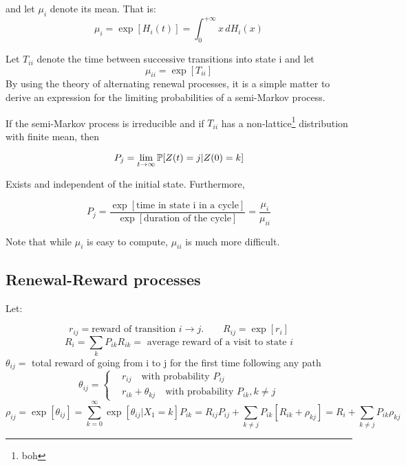 and let $\mu_i$ denote its mean. That is:
\begin{equation}
\mu_i = \exp[H_i(t)] = \int_{0}^{+\infty}x \,dH_i(x)
\end{equation}

Let $T_{ii}$ denote the time between successive transitions into state i and let
\begin{equation}
\mu_{ii}=\exp [T_{ii}]
\end{equation}
By using the theory of alternating renewal processes, it is a
simple matter to derive an expression for the limiting probabilities of a semi-Markov
process.

\begin{theorem}
	If the semi-Markov process is irreducible and if $T_{ii}$ has a non-lattice\footnote{boh} distribution with finite mean, then

	$$P_j = \lim_{t \to \infty} \mathbb{P}[Z(t)=j | Z(0)=k]$$

	Exists and independent of the initial state. Furthermore,

	$$P_j = \frac{\exp[\mbox{time in state i in a cycle}]}{\exp[\mbox{duration of the cycle}]} = \frac{\mu_i}{\mu_{ii}}$$

\end{theorem}
Note that while $\mu_i$ is easy to compute, $\mu_{ii}$ is much more difficult.

\subsection{Renewal-Reward processes}

Let:

\begin{equation}
r_{ij} = \mbox{reward of transition } i\rightarrow j. \qquad R_{ij} = \exp[r_i]
\end{equation}
\begin{equation}
R_i = \sum_k P_{ik} R_{ik} = \mbox{ average reward of a visit to state } i
\end{equation}
$\theta_{ij} = $ total reward of going from i to j for the first time following any path
\begin{equation}
\theta_{ij} = \begin{cases}
&r_{ij} \quad\mbox{with probability } P_{ij}\\
&r_{ik}+\theta_{kj}  \quad\mbox{with probability } P_{ik}, k\neq j
\end{cases}
\end{equation}
\begin{equation*}
\rho_{ij} = \exp[\theta_{ij}] = \sum_{k=0}^{\infty}\exp[\theta_{ij}| X_1=k] P_{ik} = R_{ij}P_{ij} +\sum_{k \neq j} P_{ik} [R_{ik}+\rho_{kj}] = R_i + \sum_{k \neq j}P_{ik}\rho_{kj}
\end{equation*}

